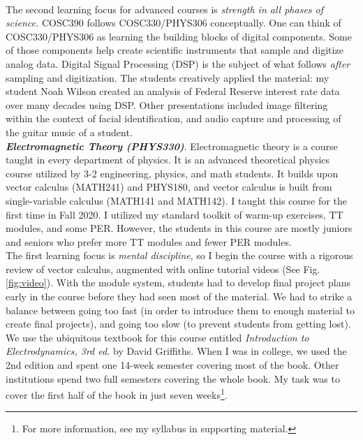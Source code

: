 \documentclass[../../../main.tex]{subfiles}
\begin{document}
\\
\vspace{0.15cm}
The second learning focus for advanced courses is \textit{strength in all phases of science.}  COSC390 follows COSC330/PHYS306 conceptually.  One can think of COSC330/PHYS306 as learning the building blocks of digital components.  Some of those components help create scientific instruments that sample and digitize analog data.  Digital Signal Processing (DSP) is the subject of what follows \textit{after} sampling and digitization.  The students creatively applied the material: my student Noah Wilson created an analysis of Federal Reserve interest rate data over many decades using DSP.  Other presentations included image filtering within the context of facial identification, and audio capture and processing of the guitar music of a student.
\\
\vspace{0.15cm}
\textbf{\textit{Electromagnetic Theory (PHYS330)}}.  Electromagnetic theory is a course taught in every department of physics.  It is an advanced theoretical physics course utilized by 3-2 engineering, physics, and math students.  It builds upon vector calculus (MATH241) and PHYS180, and vector calculus is built from single-variable calculus (MATH141 and MATH142).  I taught this course for the first time in Fall 2020.  I utilized my standard toolkit of warm-up exercises, TT modules, and some PER.  However, the students in this course are mostly juniors and seniors who prefer more TT modules and fewer PER modules.
\\
\vspace{0.15cm}
The first learning focus is \textit{mental discipline}, so I begin the course with a rigorous review of vector calculus, augmented with online tutorial videos (See Fig. \ref{fig:video}).  With the module system, students had to develop final project plans early in the course before they had seen most of the material.  We had to strike a balance between going too fast (in order to introduce them to enough material to create final projects), and going too slow (to prevent students from getting lost).  We use the ubiquitous textbook for this course entitled \textit{Introduction to Electrodynamics, 3rd ed.} by David Griffiths.  When I was in college, we used the 2nd edition and spent one 14-week semester covering most of the book.  Other institutions spend two full semesters covering the whole book.  My task was to cover the first half of the book in just seven weeks\footnote{For more information, see my syllabus in supporting material.}.
\end{document}

